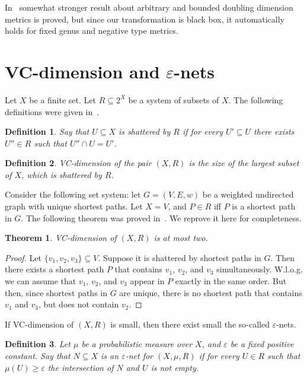 \documentclass{article}
\newcommand{\eps}{\varepsilon}
\newtheorem{definition}{Definition}
\newtheorem{theorem}{Theorem}
\begin{document}
    In~\cite{ABCDGKNS05} somewhat stronger result about arbitrary and bounded doubling dimension metrics is proved, but since our transformation
    is black box, it automatically holds for fixed genus and negative type metrics.
    \section{VC-dimension and $\eps$-nets}

    Let $X$ be a finite set. Let $R \subseteq 2^X$ be a system of subsets of $X$.
    The following definitions were given in~\cite{VC71}.

    \begin{definition}
        Say that $U \subseteq X$ is \emph{shattered} by $R$ if for every $U' \subseteq U$ there exists $U'' \in R$ such that $U'' \cap U = U'$.
    \end{definition}
    \begin{definition}
        \emph{VC-dimension} of the pair $(X, R)$ is the size of the largest subset of $X$, which is shattered by $R$.
    \end{definition}

    Consider the following set system: let $G = (V, E, w)$ be a weighted undirected graph with unique shortest paths.
    Let $X = V$, and $P \in R$ iff $P$ is a shortest path in $G$. The following theorem was proved in~\cite{ADFGW11}. We reprove it here for completeness.

    \begin{theorem}
        \label{vc_shortest}
        VC-dimension of $(X, R)$ is at most two.
    \end{theorem}
    \begin{proof}
        Let $\{v_1, v_2, v_3\} \subseteq V$. Suppose it is shattered by shortest paths in $G$.
        Then there exists a shortest path $P$ that contains $v_1$, $v_2$, and $v_3$ simultaneously.
        W.l.o.g. we can assume that $v_1$, $v_2$, and $v_3$ appear in $P$ exactly in the same order.
        But then, since shortest paths in $G$ are unique, there is no shortest path that contains $v_1$ and $v_3$, but does not contain $v_2$.
    \end{proof}

    If VC-dimension of $(X, R)$ is small, then there exist small the so-called $\eps$-nets.

    \begin{definition}
        Let $\mu$ be a probabilistic measure over $X$, and $\eps$ be a fixed positive constant.
        Say that $N \subseteq X$ is an $\eps$-net for $(X, \mu, R)$ if for every $U \in R$ such that $\mu(U) \geq \eps$ the intersection of $N$ and $U$
        is not empty.
    \end{definition}
\end{document}

